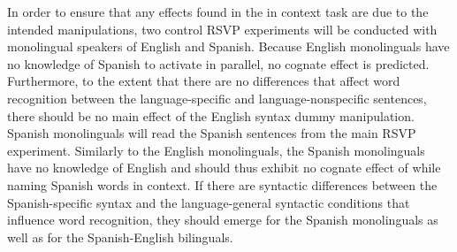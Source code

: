 In order to ensure that any effects found in the in context task are due to the intended manipulations, two control RSVP experiments will be conducted with monolingual speakers of English and Spanish.  Because English monolinguals have no knowledge of Spanish to activate in parallel, no cognate effect is predicted. Furthermore, to the extent that there are no differences that affect word recognition between the language-specific and language-nonspecific sentences, there should be no main effect of the English syntax dummy  manipulation. Spanish monolinguals will read the Spanish sentences from the main RSVP experiment. Similarly to the English monolinguals, the Spanish monolinguals have no knowledge of English and should thus exhibit no cognate effect of while naming Spanish words in context. If there are syntactic differences between the Spanish-specific syntax and the language-general syntactic conditions that influence word recognition, they should emerge for the Spanish monolinguals as well as for the Spanish-English bilinguals. 
